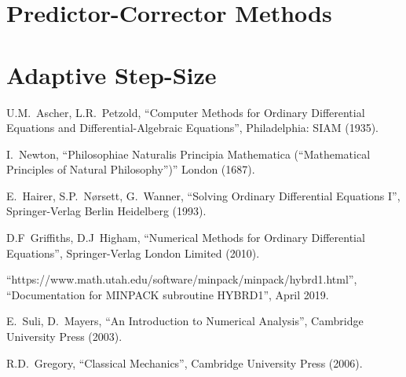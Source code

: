 \documentclass[12pt, twoside]{report}
\theoremstyle{plain}
\theoremstyle{definition}
\theoremstyle{definition}
\begin{document}
    \section{Predictor-Corrector Methods}
    \label{2_predictor_correctors}


    \section{Adaptive Step-Size}
    \label{2_adaptive}

\begin{thebibliography}{50}
        U.M.~Ascher, L.R.~Petzold,
        ``Computer Methods for Ordinary Differential Equations and 
        Differential-Algebraic Equations'',
        Philadelphia: SIAM (1935).

        I.~Newton,
        ``Philosophiae Naturalis Principia Mathematica (“Mathematical
        Principles of Natural Philosophy”)'' London (1687).

        E.~Hairer, S.P.~N{\o}rsett, G.~Wanner,
        ``Solving Ordinary Differential Equations I'',
        Springer-Verlag Berlin Heidelberg (1993).

        D.F~Griffiths, D.J~Higham,
        ``Numerical Methods for Ordinary Differential Equations'',
        Springer-Verlag London Limited (2010).

        ``https://www.math.utah.edu/software/minpack/minpack/hybrd1.html'', 
        ``Documentation for MINPACK subroutine HYBRD1'',
        April 2019.

        E.~Suli, D.~Mayers,
        ``An Introduction to Numerical Analysis'',
        Cambridge University Press (2003).

        R.D.~Gregory,
        ``Classical Mechanics'',
        Cambridge University Press (2006).


\end{thebibliography}
\end{document}
